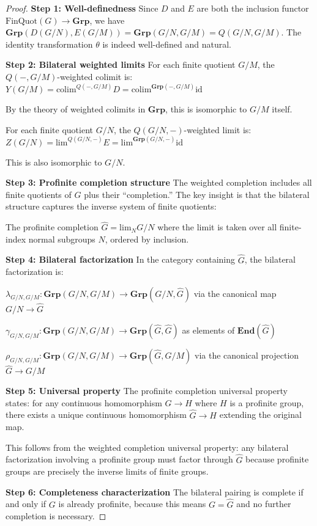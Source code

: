 \documentclass[11pt]{article}
\theoremstyle{plain}
\theoremstyle{definition}
\theoremstyle{remark}
\newcommand{\colim}{\mathrm{colim}}
\renewcommand{\lim}{\mathrm{lim}}
\begin{document}
\begin{proof}
\textbf{Step 1: Well-definedness}
Since $D$ and $E$ are both the inclusion functor $\mathrm{FinQuot}(G) \to \mathbf{Grp}$, we have $\mathbf{Grp}(D(G/N), E(G/M)) = \mathbf{Grp}(G/N, G/M) = Q(G/N, G/M)$. The identity transformation $\theta$ is indeed well-defined and natural.

\textbf{Step 2: Bilateral weighted limits}
For each finite quotient $G/M$, the $Q(-, G/M)$-weighted colimit is:
$Y(G/M) = \colim^{Q(-, G/M)} D = \colim^{\mathbf{Grp}(-, G/M)} \text{id}$

By the theory of weighted colimits in $\mathbf{Grp}$, this is isomorphic to $G/M$ itself.

For each finite quotient $G/N$, the $Q(G/N, -)$-weighted limit is:
$Z(G/N) = \lim^{Q(G/N, -)} E = \lim^{\mathbf{Grp}(G/N, -)} \text{id}$

This is also isomorphic to $G/N$.

\textbf{Step 3: Profinite completion structure}
The weighted completion includes all finite quotients of $G$ plus their ``completion.'' The key insight is that the bilateral structure captures the inverse system of finite quotients:

The profinite completion $\widehat{G} = \lim_{N} G/N$ where the limit is taken over all finite-index normal subgroups $N$, ordered by inclusion.

\textbf{Step 4: Bilateral factorization}
In the category containing $\widehat{G}$, the bilateral factorization is:

$\lambda_{G/N, G/M} : \mathbf{Grp}(G/N, G/M) \to \mathbf{Grp}(G/N, \widehat{G})$ via the canonical map $G/N \to \widehat{G}$

$\gamma_{G/N, G/M} : \mathbf{Grp}(G/N, G/M) \to \mathbf{Grp}(\widehat{G}, \widehat{G})$ as elements of $\mathbf{End}(\widehat{G})$

$\rho_{G/N, G/M} : \mathbf{Grp}(G/N, G/M) \to \mathbf{Grp}(\widehat{G}, G/M)$ via the canonical projection $\widehat{G} \to G/M$

\textbf{Step 5: Universal property}
The profinite completion universal property \cite{pontryagin1966topological} states: for any continuous homomorphism $G \to H$ where $H$ is a profinite group, there exists a unique continuous homomorphism $\widehat{G} \to H$ extending the original map.

This follows from the weighted completion universal property: any bilateral factorization involving a profinite group must factor through $\widehat{G}$ because profinite groups are precisely the inverse limits of finite groups.

\textbf{Step 6: Completeness characterization}
The bilateral pairing is complete if and only if $G$ is already profinite, because this means $G = \widehat{G}$ and no further completion is necessary.
\end{proof}
\end{document}
